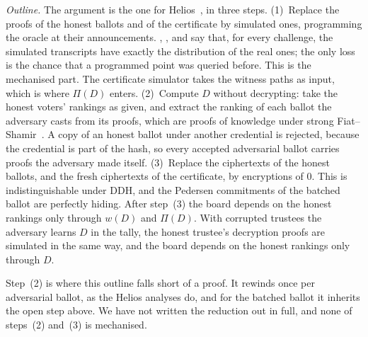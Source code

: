 \emph{Outline.} The argument is the one for
Helios~\cite{bpw12,bcgpw15}, in three steps. (1)~Replace the proofs of
the honest ballots and of the certificate by simulated ones, programming
the oracle at their announcements. ,
, and  say that, for every challenge,
the simulated transcripts have exactly the distribution of the real
ones; the only loss is the chance that a programmed point was queried
before. This is the mechanised part. The certificate simulator takes
the witness paths as input, which is where $\Pi(D)$ enters. (2)~Compute
$D$ without decrypting: take the honest voters' rankings as given, and
extract the ranking of each ballot the adversary casts from its proofs,
which are proofs of knowledge under strong
Fiat--Shamir~\cite{bpw12}. A copy of an honest ballot under another
credential is rejected, because the credential is part of the hash, so
every accepted adversarial ballot carries proofs the adversary made
itself. (3)~Replace the ciphertexts of the honest ballots, and the fresh
ciphertexts of the certificate, by encryptions of $0$. This is
indistinguishable under DDH, and the Pedersen commitments of the batched
ballot are perfectly hiding. After step~(3) the board depends on the
honest rankings only through $w(D)$ and $\Pi(D)$. With corrupted
trustees the adversary learns $D$ in the tally, the honest trustee's
decryption proofs are simulated in the same way, and the board depends
on the honest rankings only through $D$.

Step~(2) is where this outline falls short of a proof. It rewinds once
per adversarial ballot, as the Helios analyses do, and for the batched
ballot it inherits the open step above. We have not written the
reduction out in full, and none of steps~(2) and~(3) is mechanised.
